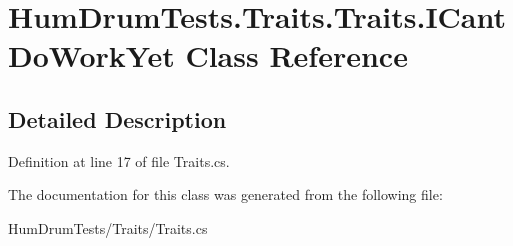 \hypertarget{classHumDrumTests_1_1Traits_1_1Traits_1_1ICantDoWorkYet}{}\section{Hum\+Drum\+Tests.\+Traits.\+Traits.\+I\+Cant\+Do\+Work\+Yet Class Reference}
\label{classHumDrumTests_1_1Traits_1_1Traits_1_1ICantDoWorkYet}


\subsection{Detailed Description}


Definition at line 17 of file Traits.\+cs.



The documentation for this class was generated from the following file\+:\begin{DoxyCompactItemize}
\item 
Hum\+Drum\+Tests/\+Traits/Traits.\+cs\end{DoxyCompactItemize}
